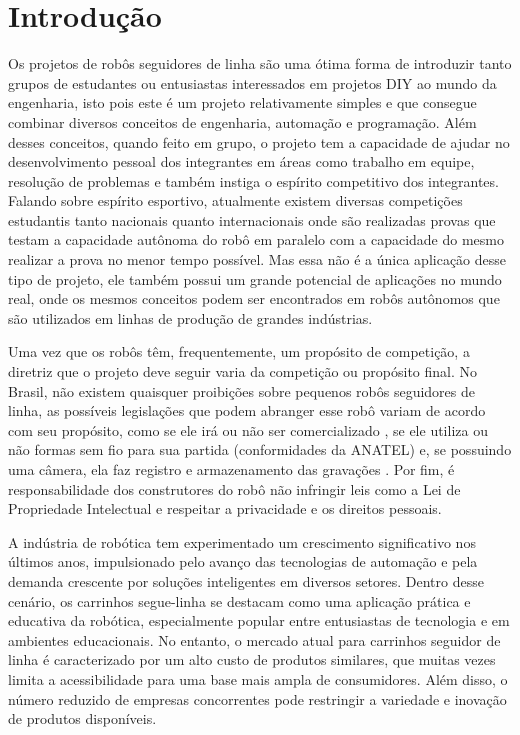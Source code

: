 \chapter{Introdução}

Os projetos de robôs seguidores de linha são uma ótima forma de introduzir tanto
grupos de estudantes ou entusiastas interessados em projetos DIY ao mundo da
engenharia, isto pois este é um projeto relativamente simples e que consegue
combinar diversos conceitos de engenharia, automação e programação. Além desses
conceitos, quando feito em grupo, o projeto tem a capacidade de ajudar no
desenvolvimento pessoal dos integrantes em áreas como trabalho em equipe,
resolução de problemas e também instiga o espírito competitivo dos integrantes.
Falando sobre espírito esportivo, atualmente existem diversas competições
estudantis tanto nacionais quanto internacionais onde são realizadas provas que
testam a capacidade autônoma do robô em paralelo com a capacidade do mesmo
realizar a prova no menor tempo possível. Mas essa não é a única aplicação desse
tipo de projeto, ele também possui um grande potencial de aplicações no mundo
real, onde os mesmos conceitos podem ser encontrados em robôs autônomos que são
utilizados em linhas de produção de grandes indústrias.

Uma vez que os robôs têm, frequentemente, um propósito de competição, a diretriz
que o projeto deve seguir varia da competição ou propósito final. No Brasil, não
existem quaisquer proibições sobre pequenos robôs seguidores de linha, as
possíveis legislações que podem abranger esse robô variam de acordo com seu
propósito, como se ele irá ou não ser comercializado \cite{Lei:8078:1990}, se
ele utiliza ou não formas sem fio para sua partida (conformidades da ANATEL) e,
se possuindo uma câmera, ela faz registro e armazenamento das gravações
\cite{Lei:12651:2012}. Por fim, é responsabilidade dos construtores do robô não
infringir leis como a Lei de Propriedade Intelectual \cite{Lei:9279:1996} e
respeitar a privacidade e os direitos pessoais.

A indústria de robótica tem experimentado um crescimento significativo nos
últimos anos, impulsionado pelo avanço das tecnologias de automação e pela
demanda crescente por soluções inteligentes em diversos setores. Dentro desse
cenário, os carrinhos segue-linha se destacam como uma aplicação prática e
educativa da robótica, especialmente popular entre entusiastas de tecnologia e
em ambientes educacionais. No entanto, o mercado atual para carrinhos
seguidor de linha é caracterizado por um alto custo de produtos similares, que
muitas vezes limita a acessibilidade para uma base mais ampla de consumidores.
Além disso, o número reduzido de empresas concorrentes pode restringir a
variedade e inovação de produtos disponíveis.

